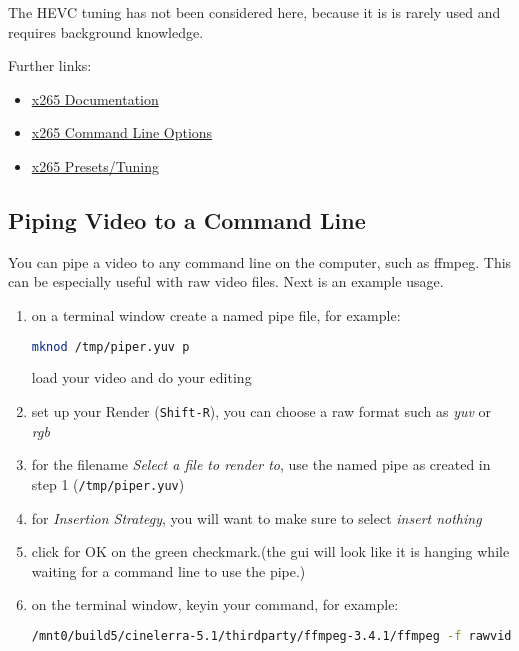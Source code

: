 The HEVC tuning has not been considered here, because it is is
rarely used and requires background knowledge.

Further links:
\begin{itemize}
    \item \href{http://x265.readthedocs.org/en/default/}{x265
        Documentation}
    \item \href{http://x265.readthedocs.org/en/latest/cli.html}{x265
        Command Line Options}
    \item \href{http://x265.readthedocs.org/en/latest/presets.html}{x265
        Presets/Tuning}
\end{itemize}

\subsection{Piping Video to a Command Line}%
\label{sub:piping_video_command_line}

You can pipe a video to any command line on the computer, such as ffmpeg.  This can be especially useful with raw video files.  Next is an example usage.

\begin{enumerate}
    \item on a terminal window create a named pipe file, for example:
    \begin{lstlisting}[language=bash,numbers=none]
mknod /tmp/piper.yuv p
    \end{lstlisting}
    load your video and do your editing
    \item set up your Render (\texttt{Shift-R}), you can choose a raw format such as \textit{yuv} or \textit{rgb}
    \item for the filename \textit{Select a file to render to}, use the named pipe as created in step 1 (\texttt{/tmp/piper.yuv})
    \item for \textit{Insertion Strategy}, you will want to make sure to select \textit{insert nothing}
    \item click for OK on the green checkmark.(the \CGG{} gui will look like it is hanging while waiting for a command line to use the pipe.)
    \item on the terminal window, keyin your command, for example:
    \begin{lstlisting}[language=bash,numbers=none]
/mnt0/build5/cinelerra-5.1/thirdparty/ffmpeg-3.4.1/ffmpeg -f rawvideo -pixel_format yuv420p \ -video_size 1280x720 -framerate 30000/1001 -i /tmp/piper.yuv /tmp/pys.mov
    \end{lstlisting}
\end{enumerate}

